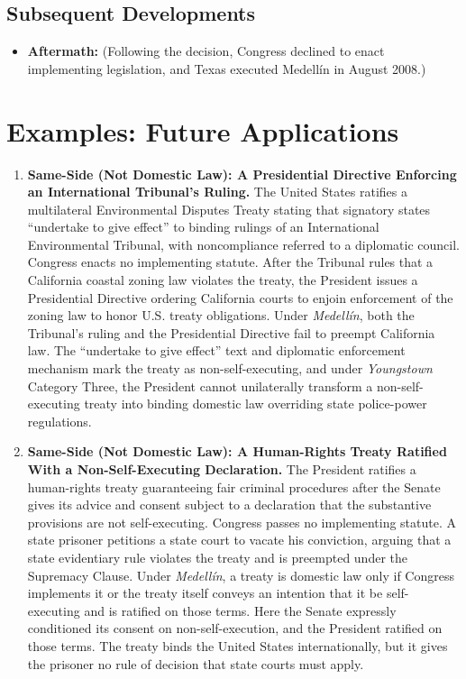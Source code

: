 \documentclass[12pt]{article}
\begin{document}
\subsection{Subsequent Developments}

\begin{itemize}

\item \textbf{Aftermath:} (Following the decision, Congress declined to enact implementing legislation, and Texas executed Medell\'{i}n in August 2008.)

\end{itemize}

\section{Examples: Future Applications}
\begin{enumerate}

\item \textbf{Same-Side (Not Domestic Law): A Presidential Directive Enforcing an International Tribunal's Ruling.} The United States ratifies a multilateral Environmental Disputes Treaty stating that signatory states ``undertake to give effect'' to binding rulings of an International Environmental Tribunal, with noncompliance referred to a diplomatic council. Congress enacts no implementing statute. After the Tribunal rules that a California coastal zoning law violates the treaty, the President issues a Presidential Directive ordering California courts to enjoin enforcement of the zoning law to honor U.S. treaty obligations. Under \textit{Medell\'{i}n}, both the Tribunal's ruling and the Presidential Directive fail to preempt California law. The ``undertake to give effect'' text and diplomatic enforcement mechanism mark the treaty as non-self-executing, and under \textit{Youngstown} Category Three, the President cannot unilaterally transform a non-self-executing treaty into binding domestic law overriding state police-power regulations.

\item \textbf{Same-Side (Not Domestic Law): A Human-Rights Treaty Ratified With a Non-Self-Executing Declaration.} The President ratifies a human-rights treaty guaranteeing fair criminal procedures after the Senate gives its advice and consent subject to a declaration that the substantive provisions are not self-executing. Congress passes no implementing statute. A state prisoner petitions a state court to vacate his conviction, arguing that a state evidentiary rule violates the treaty and is preempted under the Supremacy Clause. Under \textit{Medell\'{i}n}, a treaty is domestic law only if Congress implements it or the treaty itself conveys an intention that it be self-executing and is ratified on those terms. Here the Senate expressly conditioned its consent on non-self-execution, and the President ratified on those terms. The treaty binds the United States internationally, but it gives the prisoner no rule of decision that state courts must apply.


\end{enumerate}
\end{document}
